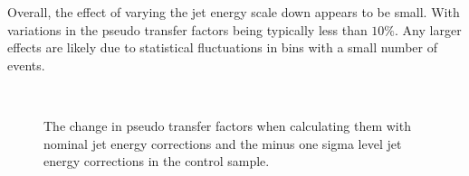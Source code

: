 Overall, the effect of varying the jet energy scale down appears to be
small. With variations in the pseudo transfer factors being typically
less than $10\%$. Any larger effects are likely due to statistical
fluctuations in bins with a small number of events.


\begin{figure}[]
  \centering
   ~~
  \caption{\label{fig:jes-syst-singleMu} The change in pseudo transfer
  factors when calculating them with nominal jet energy corrections
  and the minus one sigma level jet energy corrections in the \mj
  control sample.}
\end{figure}

